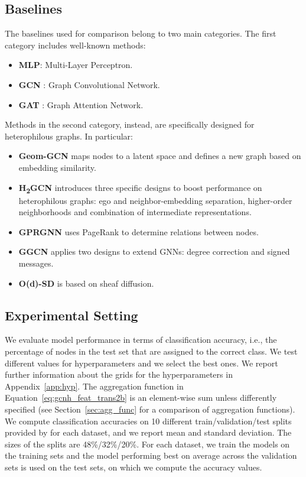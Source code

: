 \documentclass[conference]{IEEEtran}
\begin{document}
\subsection{Baselines}
The baselines used for comparison belong to two main categories. The first category includes well-known methods:
\begin{itemize}
    \item \textbf{MLP}: Multi-Layer Perceptron.
    \item \textbf{GCN} \cite{kipf_semi_2017}: Graph Convolutional Network.
    \item \textbf{GAT} \cite{velickovic_graph_2018}: Graph Attention Network.
\end{itemize}
Methods in the second category, instead, are specifically designed for heterophilous graphs. In particular:
\begin{itemize}
    \item \textbf{Geom-GCN} \cite{pei_geom-gcn_2019} maps nodes to a latent space and defines a new graph based on embedding similarity.
    \item \textbf{H\textsubscript{2}GCN} \cite{zhu_beyond_2020} introduces three specific designs to boost performance on heterophilous graphs: ego and neighbor-embedding separation, higher-order neighborhoods and combination of intermediate representations.
    \item \textbf{GPRGNN} \cite{chien_adaptive_2021} uses PageRank to determine relations between nodes.
    \item \textbf{GGCN} \cite{yan_two_2021} applies two designs to extend GNNs: degree correction and signed messages.
    \item \textbf{O(d)-SD} \cite{bodnar_neural_2022} is based on sheaf diffusion.
\end{itemize}

\subsection{Experimental Setting}
We evaluate model performance in terms of classification accuracy, i.e., the percentage of nodes in the test set that are assigned to the correct class.
We test different values for hyperparameters and we select the best ones. We report further information about the grids for the hyperparameters in Appendix~\ref{app:hyp}. The aggregation function  in Equation~\eqref{eq:gcnh_feat_trans2b} is an element-wise sum unless differently specified (see Section~\ref{sec:agg_func} for a comparison of aggregation functions).
We compute classification accuracies on 10 different train/validation/test splits provided by \cite{pei_geom-gcn_2019} for each dataset, and we report mean and standard deviation. The sizes of the splits are 48\%/32\%/20\%. For each dataset, we train the models on the training sets and the model performing best on average across the validation sets is used on the test sets, on which we compute the accuracy values.
\end{document}
